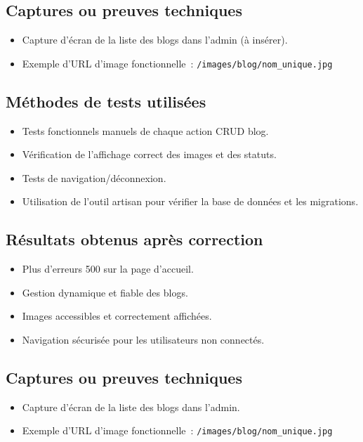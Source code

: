 \documentclass[a4paper,12pt]{report}
\begin{document}
\subsection{Captures ou preuves techniques}
\begin{itemize}
    \item Capture d’écran de la liste des blogs dans l’admin (à insérer).
    \item Exemple d’URL d’image fonctionnelle : \texttt{/images/blog/nom\_unique.jpg}
\end{itemize}

\subsection{Méthodes de tests utilisées}
\begin{itemize}
    \item Tests fonctionnels manuels de chaque action CRUD blog.
    \item Vérification de l’affichage correct des images et des statuts.
    \item Tests de navigation/déconnexion.
    \item Utilisation de l’outil artisan pour vérifier la base de données et les migrations.
\end{itemize}

\subsection{Résultats obtenus après correction}
\begin{itemize}
    \item Plus d’erreurs 500 sur la page d’accueil.
    \item Gestion dynamique et fiable des blogs.
    \item Images accessibles et correctement affichées.
    \item Navigation sécurisée pour les utilisateurs non connectés.
\end{itemize}

\subsection{Captures ou preuves techniques}
\begin{itemize}
    \item Capture d’écran de la liste des blogs dans l’admin.
    \item Exemple d’URL d’image fonctionnelle : \texttt{/images/blog/nom\_unique.jpg}
\end{itemize}
\end{document}
